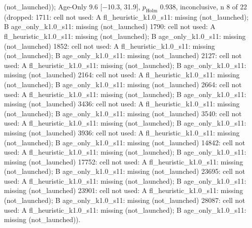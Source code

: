 \begin{table}[t]
{(not\_launched)); Age-Only 9.6 [$-$10.3, 31.9], $p_\mathrm{Holm}$ 0.938, inconclusive, n 8 of 22 (dropped: 1711: cell not used: A fl\_heuristic\_k1.0\_s11: missing (not\_launched); B age\_only\_k1.0\_s11: missing (not\_launched) \textbar{} 1790: cell not used: A fl\_heuristic\_k1.0\_s11: missing (not\_launched); B age\_only\_k1.0\_s11: missing (not\_launched) \textbar{} 1852: cell not used: A fl\_heuristic\_k1.0\_s11: missing (not\_launched); B age\_only\_k1.0\_s11: missing (not\_launched) \textbar{} 2127: cell not used: A fl\_heuristic\_k1.0\_s11: missing (not\_launched); B age\_only\_k1.0\_s11: missing (not\_launched) \textbar{} 2164: cell not used: A fl\_heuristic\_k1.0\_s11: missing (not\_launched); B age\_only\_k1.0\_s11: missing (not\_launched) \textbar{} 2664: cell not used: A fl\_heuristic\_k1.0\_s11: missing (not\_launched); B age\_only\_k1.0\_s11: missing (not\_launched) \textbar{} 3436: cell not used: A fl\_heuristic\_k1.0\_s11: missing (not\_launched); B age\_only\_k1.0\_s11: missing (not\_launched) \textbar{} 3540: cell not used: A fl\_heuristic\_k1.0\_s11: missing (not\_launched); B age\_only\_k1.0\_s11: missing (not\_launched) \textbar{} 3936: cell not used: A fl\_heuristic\_k1.0\_s11: missing (not\_launched); B age\_only\_k1.0\_s11: missing (not\_launched) \textbar{} 14842: cell not used: A fl\_heuristic\_k1.0\_s11: missing (not\_launched); B age\_only\_k1.0\_s11: missing (not\_launched) \textbar{} 17752: cell not used: A fl\_heuristic\_k1.0\_s11: missing (not\_launched); B age\_only\_k1.0\_s11: missing (not\_launched) \textbar{} 23695: cell not used: A fl\_heuristic\_k1.0\_s11: missing (not\_launched); B age\_only\_k1.0\_s11: missing (not\_launched) \textbar{} 23901: cell not used: A fl\_heuristic\_k1.0\_s11: missing (not\_launched); B age\_only\_k1.0\_s11: missing (not\_launched) \textbar{} 28087: cell not used: A fl\_heuristic\_k1.0\_s11: missing (not\_launched); B age\_only\_k1.0\_s11: missing (not\_launched)). 
}
\end{table}
